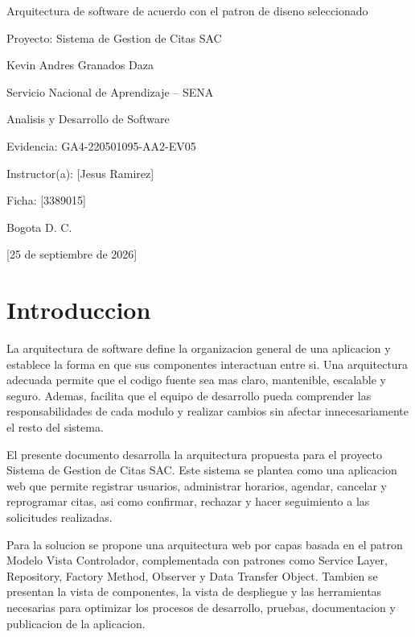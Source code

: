 \documentclass[12pt,letterpaper]{article}
\newcommand{\institucion}{Servicio Nacional de Aprendizaje -- SENA}
\newcommand{\programa}{Analisis y Desarrollo de Software}
\newcommand{\tituloTrabajo}{Arquitectura de software de acuerdo con el patron de diseno seleccionado}
\newcommand{\codigoEvidencia}{GA4-220501095-AA2-EV05}
\newcommand{\nombreProyecto}{Sistema de Gestion de Citas SAC}
\newcommand{\aprendiz}{Kevin Andres Granados Daza}
\newcommand{\instructor}{[Jesus Ramirez]}
\newcommand{\ficha}{[3389015]}
\newcommand{\ciudad}{Bogota D. C.}
\newcommand{\fechaEntrega}{[25 de septiembre de 2026]}
\begin{document}
\begin{titlepage}
    \centering
    \vspace*{2.5cm}
    {\Large \tituloTrabajo\par}
    \vspace{0.8cm}
    {\large Proyecto: \nombreProyecto\par}
    \vfill
    {\large \aprendiz\par}
    \vspace{1.5cm}
    {\large \institucion\par}
    {\large \programa\par}
    \vspace{1cm}
    {\large Evidencia: \codigoEvidencia\par}
    \vspace{1cm}
    {\large Instructor(a): \instructor\par}
    {\large Ficha: \ficha\par}
    \vfill
    {\large \ciudad\par}
    {\large \fechaEntrega\par}
\end{titlepage}

\section{Introduccion}

La arquitectura de software define la organizacion general de una aplicacion y establece la forma en que sus componentes interactuan entre si. Una arquitectura adecuada permite que el codigo fuente sea mas claro, mantenible, escalable y seguro. Ademas, facilita que el equipo de desarrollo pueda comprender las responsabilidades de cada modulo y realizar cambios sin afectar innecesariamente el resto del sistema.

El presente documento desarrolla la arquitectura propuesta para el proyecto \nombreProyecto. Este sistema se plantea como una aplicacion web que permite registrar usuarios, administrar horarios, agendar, cancelar y reprogramar citas, asi como confirmar, rechazar y hacer seguimiento a las solicitudes realizadas.

Para la solucion se propone una arquitectura web por capas basada en el patron Modelo Vista Controlador, complementada con patrones como Service Layer, Repository, Factory Method, Observer y Data Transfer Object. Tambien se presentan la vista de componentes, la vista de despliegue y las herramientas necesarias para optimizar los procesos de desarrollo, pruebas, documentacion y publicacion de la aplicacion.
\end{document}
